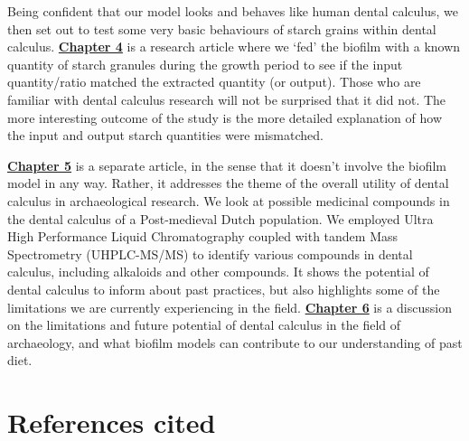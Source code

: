 \documentclass[
  b5paper,
]{book}
\begin{document}
Being confident that our model looks and behaves like human dental
calculus, we then set out to test some very basic behaviours of starch
grains within dental calculus. \hyperref[byoc-starch]{\textbf{Chapter
4}} is a research article where we `fed' the biofilm with a known
quantity of starch granules during the growth period to see if the input
quantity/ratio matched the extracted quantity (or output). Those who are
familiar with dental calculus research will not be surprised that it did
not. The more interesting outcome of the study is the more detailed
explanation of how the input and output starch quantities were
mismatched.

\hyperref[mb11CalculusPilot]{\textbf{Chapter 5}} is a separate article,
in the sense that it doesn't involve the biofilm model in any way.
Rather, it addresses the theme of the overall utility of dental calculus
in archaeological research. We look at possible medicinal compounds in
the dental calculus of a Post-medieval Dutch population. We employed
Ultra High Performance Liquid Chromatography coupled with tandem Mass
Spectrometry (UHPLC-MS/MS) to identify various compounds in dental
calculus, including alkaloids and other compounds. It shows the
potential of dental calculus to inform about past practices, but also
highlights some of the limitations we are currently experiencing in the
field. \hyperref[chap-discussion]{\textbf{Chapter 6}} is a discussion on
the limitations and future potential of dental calculus in the field of
archaeology, and what biofilm models can contribute to our understanding
of past diet.

\section*{References cited}\label{references-cited}

\end{document}
